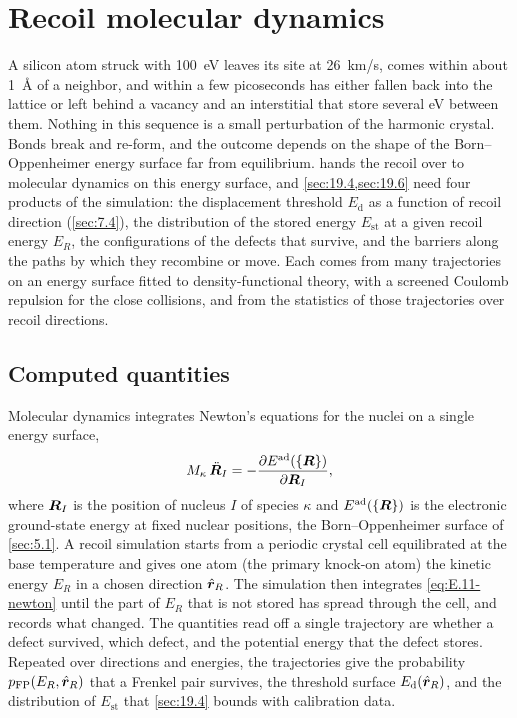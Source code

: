 \section{Recoil molecular dynamics}\label{app:E.11}

A silicon atom struck with \SI{100}{eV} leaves its site at \SI{26}{km/s}, comes within about \SI{1}{\angstrom} of a neighbor, and within a few picoseconds has either fallen back into the lattice or left behind a vacancy and an interstitial that store several eV between them. Nothing in this sequence is a small perturbation of the harmonic crystal. Bonds break and re-form, and the outcome depends on the shape of the Born--Oppenheimer energy surface far from equilibrium.  hands the recoil over to molecular dynamics on this energy surface, and \cref{sec:19.4,sec:19.6} need four products of the simulation: the displacement threshold $E_{\mathrm{d}}$ as a function of recoil direction (\cref{sec:7.4}), the distribution of the stored energy $E_{\mathrm{st}}$ at a given recoil energy $E_R$, the configurations of the defects that survive, and the barriers along the paths by which they recombine or move. Each comes from many trajectories on an energy surface fitted to density-functional theory, with a screened Coulomb repulsion for the close collisions, and from the statistics of those trajectories over recoil directions.

\subsection{Computed quantities}

Molecular dynamics integrates Newton's equations for the nuclei on a single energy surface,
\begin{equation}
  M_\kappa\,\ddot{\bm{R}}_I = -\frac{\partial E^{\mathrm{ad}}(\{\bm{R}\})}{\partial\bm{R}_I},
  \label{eq:E.11-newton}
\end{equation}
where $\bm{R}_I$ is the position of nucleus $I$ of species $\kappa$ and $E^{\mathrm{ad}}(\{\bm{R}\})$ is the electronic ground-state energy at fixed nuclear positions, the Born--Oppenheimer surface of \cref{sec:5.1}. A recoil simulation starts from a periodic crystal cell equilibrated at the base temperature and gives one atom (the primary knock-on atom) the kinetic energy $E_R$ in a chosen direction $\hat{\bm{r}}_R$. The simulation then integrates \cref{eq:E.11-newton} until the part of $E_R$ that is not stored has spread through the cell, and records what changed. The quantities read off a single trajectory are whether a defect survived, which defect, and the potential energy that the defect stores. Repeated over directions and energies, the trajectories give the probability $p_{\mathrm{FP}}(E_R, \hat{\bm{r}}_R)$ that a Frenkel pair survives, the threshold surface $E_{\mathrm{d}}(\hat{\bm{r}}_R)$, and the distribution of $E_{\mathrm{st}}$ that \cref{sec:19.4} bounds with calibration data.

